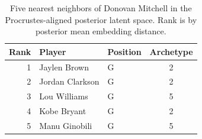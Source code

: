 \begin{table}[htbp]
  \centering\small
  \begin{tabular}{rllc}
    \toprule
    Rank & Player & Position & Archetype \\
    \midrule
    1 & Jaylen Brown & G & 2 \\
    2 & Jordan Clarkson & G & 2 \\
    3 & Lou Williams & G & 5 \\
    4 & Kobe Bryant & G & 2 \\
    5 & Manu Ginobili & G & 5 \\
    \bottomrule
  \end{tabular}
  \caption{Five nearest neighbors of Donovan Mitchell in the Procrustes-aligned posterior latent space. Rank is by posterior mean embedding distance.}
  \label{tab:Donovan_Mitchell_neighbors}
\end{table}

